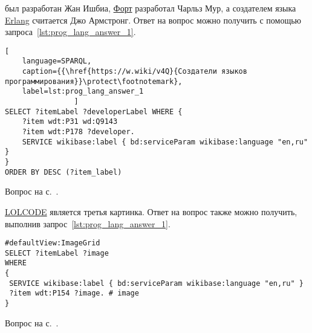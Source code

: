 \begin{task}
\label{answer:prog_lang_1}
    был разработан Жан Ишбиа, 
    \href{https://ru.wikipedia.org/wiki/Форт_(язык_программирования)}{Форт} разработал Чарльз Мур, 
    а создателем языка \href{https://ru.wikipedia.org/wiki/Erlang}{Erlang} считается Джо Армстронг. 
    Ответ на вопрос можно получить с помощью запроса~\ref{lst:prog_lang_answer_1}. 
\begin{lstlisting}[
    language=SPARQL, 
    caption={{\href{https://w.wiki/v4Q}{Создатели языков программирования}}\protect\footnotemark}, 
    label=lst:prog_lang_answer_1
                ]
SELECT ?itemLabel ?developerLabel WHERE {
    ?item wdt:P31 wd:Q9143
    ?item wdt:P178 ?developer.
    SERVICE wikibase:label { bd:serviceParam wikibase:language "en,ru" }
}
ORDER BY DESC (?item_label)
\end{lstlisting}

\small{Вопрос на с.~\pageref{question:prog_lang_1}.}
\end{task}



\begin{task}
\label{answer:prog_lang_2}
    \href{https://ru.wikipedia.org/wiki/LOLCODE}{LOLCODE} является третья картинка. 
    Ответ на вопрос также можно получить, выполнив запрос~\ref{lst:prog_lang_answer_1}. 
	\begin{lstlisting}[language=SPARQL, caption={{\href{https://w.wiki/v4U}{Логотипы языков программирования}}\protect\footnotemark}, label=lst:prog_lang_answer_1]
#defaultView:ImageGrid
SELECT ?itemLabel ?image
WHERE
{
 SERVICE wikibase:label { bd:serviceParam wikibase:language "en,ru" }
 ?item wdt:P154 ?image. # image
}
\end{lstlisting}

\small{Вопрос на с.~\pageref{question:prog_lang_2}.}
\end{task}



